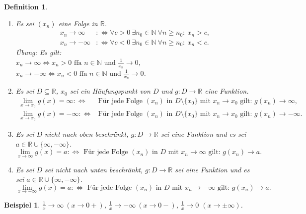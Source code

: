 \documentclass[12pt]{extreport} %
\newcommand{\N}{\mathbb{N}}
\newcommand{\R}{\mathbb{R}}
\theoremstyle{named}
\theoremstyle{itshape}
\newtheorem*{definition}{Definition}
\theoremstyle{normal}
\newtheorem{beispiel}[unnamedtheorem]{Beispiel}
\begin{document}
\begin{definition} ~\
	\begin{enumerate}
		\item Es sei $(x_{n})$ eine Folge in $\R$.
			\begin{align*}
				x_{n} \rightarrow \infty & :\iff \forall c > 0 ~ \exists n_{0}  \in \N ~ \forall n \geq n_{0}: ~ x_{n} > c, \\
				x_{n} \rightarrow - \infty & :\iff \forall c < 0 ~ \exists n_{0} \in \N ~ \forall n \geq n_{0}: ~ x_{n} < c.
			\end{align*}
			Übung:  Es gilt: \\
			$x_{n} \rightarrow \infty \iff x_{n} > 0 \text{ ffa } n \in \N \text{ und } \frac{1}{x_{n}} \rightarrow 0$, \\
			$x_{n} \rightarrow -\infty \iff x_{n} < 0 \text{ ffa } n \in \N \text{ und } \frac{1}{x_{n}} \rightarrow 0$.
		\item Es sei $D \subseteq \R$, $x_{0}$ sei ein Häufungspunkt von $D$ und $g \colon D \rightarrow \R$ eine Funktion.
			\begin{align*}
				\lim_{x \rightarrow x_{0}} g(x) = \infty :\iff & \text{Für jede Folge } (x_{n}) \text{ in } D \setminus \{ x_{0} \} \text{ mit } 
				x_{n} \rightarrow x_{0} \text{ gilt: } g(x_{n}) \rightarrow \infty, \\
				\lim_{x \rightarrow x_{0}} g(x) = -\infty :\iff & \text{Für jede Folge } (x_{n}) \text{ in } D \setminus \{ x_{0} \} \text{ mit } 
				x_{n} \rightarrow x_{0} \text{ gilt: } g(x_{n}) \rightarrow -\infty.
			\end{align*}
		\item Es sei $D$ nicht nach oben beschränkt, $g \colon D \rightarrow \R$ sei eine Funktion und es sei $a \in \R \cup \{ \infty, - \infty \}$.
			$$ \lim_{x \rightarrow \infty} g(x) = a :\iff \text{ Für jede Folge } (x_{n}) \text{ in } D \text{ mit } x_{n} \rightarrow \infty \text{ gilt: } 
			g(x_{n}) \rightarrow a. $$
		\item Es sei $D$ sei nicht nach unten beschränkt, $g \colon D \rightarrow \R$ sei eine Funktion und es sei $a \in \R \cup \{ \infty, - \infty \}$.
			$$ \lim_{x \rightarrow -\infty} g(x) = a :\iff \text{ Für jede Folge } (x_{n}) \text{ in } D \text{ mit } x_{n} \rightarrow -\infty \text{ gilt: } 
			g(x_{n}) \rightarrow a. $$		
	\end{enumerate}
\end{definition}


\begin{beispiel}
	$\frac{1}{x} \rightarrow \infty ~(x \rightarrow 0+)$, $\frac{1}{x} \rightarrow -\infty ~(x \rightarrow 0-)$, $\frac{1}{x} \rightarrow 0$ $(x \rightarrow \pm \infty)$.
\end{beispiel}
\end{document}
